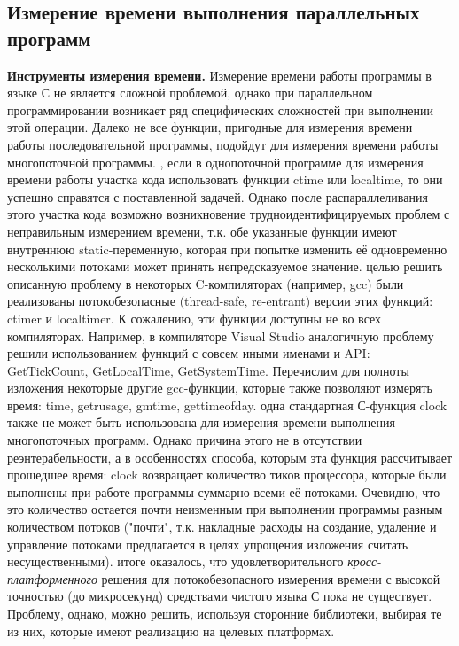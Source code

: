 { %
	\subsection{Измерение времени выполнения параллельных программ}
	\par\textbf{Инструменты измерения времени.} Измерение времени работы программы в языке С не является сложной проблемой, однако при параллельном программировании возникает ряд специфических сложностей при выполнении этой операции. Далеко не все функции, пригодные для измерения времени работы последовательной программы, подойдут для измерения времени работы многопоточной программы. 
	, если в однопоточной программе для измерения времени работы участка кода использовать функции ctime или localtime, то они успешно справятся с поставленной задачей. Однако после распараллеливания этого участка кода возможно возникновение трудноидентифицируемых проблем с неправильным измерением времени, т.к. обе указанные функции имеют внутреннюю static-переменную, которая при попытке изменить её одновременно несколькими потоками может принять непредсказуемое значение.
	 целью решить описанную проблему в некоторых C-компиляторах (например, gcc) были реализованы потокобезопасные (thread-safe, re-entrant) версии этих функций: ctime\textunderscore r и localtime\textunderscore r. К сожалению, эти функции доступны не во всех компиляторах. Например, в компиляторе Visual Studio аналогичную проблему решили использованием функций с совсем иными именами и API: GetTickCount, GetLocalTime, GetSystemTime. Перечислим для полноты изложения некоторые другие gcc-функции, которые также позволяют измерять время: time, getrusage, gmtime, gettimeofday.
	 одна стандартная С-функция clock также не может быть использована для измерения времени выполнения многопоточных программ. Однако причина этого не в отсутствии реэнтерабельности, а в особенностях способа, которым эта функция рассчитывает прошедшее время: clock возвращает количество тиков процессора, которые были выполнены при работе программы суммарно всеми её потоками. Очевидно, что это количество остается почти неизменным при выполнении программы разным количеством потоков ("почти", т.к. накладные расходы на создание, удаление и управление потоками предлагается в целях упрощения изложения считать несущественными).
	 итоге оказалось, что удовлетворительного \textit{кросс-платформенного} решения для потокобезопасного измерения времени с высокой точностью (до микросекунд) средствами чистого языка С пока не существует. Проблему, однако, можно решить, используя сторонние библиотеки, выбирая те из них, которые имеют реализацию на целевых платформах. 
}
